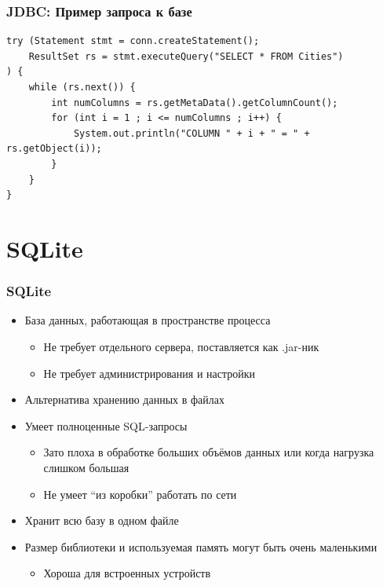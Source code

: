 \documentclass[xetex,mathserif,serif]{beamer}
\begin{document}
	\begin{frame}[fragile]
		\frametitle{JDBC: Пример запроса к базе}
		\begin{footnotesize}
			\begin{verbatim}
try (Statement stmt = conn.createStatement();
    ResultSet rs = stmt.executeQuery("SELECT * FROM Cities")
) {
    while (rs.next()) {
        int numColumns = rs.getMetaData().getColumnCount();
        for (int i = 1 ; i <= numColumns ; i++) {
            System.out.println("COLUMN " + i + " = " + rs.getObject(i));
        }
    }
}
			\end{verbatim}
		\end{footnotesize}
	\end{frame}

	\section{SQLite}

	\begin{frame}
		\frametitle{SQLite}
		\begin{itemize}
			\item База данных, работающая в пространстве процесса
			\begin{itemize}
				\item Не требует отдельного сервера, поставляется как .jar-ник
				\item Не требует администрирования и настройки
			\end{itemize}
			\item Альтернатива хранению данных в файлах
			\item Умеет полноценные SQL-запросы
			\begin{itemize}
				\item Зато плоха в обработке больших объёмов данных или когда нагрузка слишком большая
				\item Не умеет ``из коробки'' работать по сети
			\end{itemize}
			\item Хранит всю базу в одном файле
			\item Размер библиотеки и используемая память могут быть очень маленькими
			\begin{itemize}
				\item Хороша для встроенных устройств
			\end{itemize}
		\end{itemize}
	\end{frame}
\end{document}
